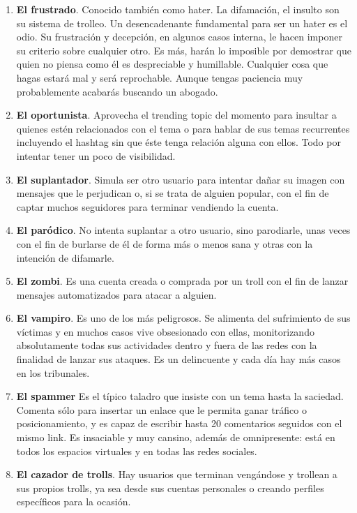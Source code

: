 \documentclass[../all.tex]{subfiles}
\begin{document}
\begin{enumerate}[resume]
        \item \textbf{El frustrado}. Conocido también como hater. La difamación, el insulto son su sistema de trolleo. Un desencadenante fundamental para ser un hater es el odio. Su frustración y decepción, en algunos casos interna, le hacen imponer su criterio sobre cualquier otro. Es más, harán lo imposible por demostrar que quien no piensa como él es despreciable y humillable. Cualquier cosa que hagas estará mal y será reprochable. Aunque tengas paciencia muy probablemente acabarás buscando un abogado.
        \item \textbf{El oportunista}. Aprovecha el trending topic del momento para insultar a quienes estén relacionados con el tema o para hablar de sus temas recurrentes incluyendo el hashtag sin que éste tenga relación alguna con ellos. Todo por intentar tener un poco de visibilidad.
        \item \textbf{El suplantador}. Simula ser otro usuario para intentar dañar su imagen con mensajes que le perjudican o, si se trata de alguien popular, con el fin de captar muchos seguidores para terminar vendiendo la cuenta.
        \item \textbf{El paródico}. No intenta suplantar a otro usuario, sino parodiarle, unas veces con el fin de burlarse de él de forma más o menos sana y otras con la intención de difamarle.
        \item \textbf{El zombi}. Es una cuenta creada o comprada por un troll con el fin de lanzar mensajes automatizados para atacar a alguien.
        \item \textbf{El vampiro}. Es uno de los más peligrosos. Se alimenta del sufrimiento de sus víctimas y en muchos casos vive obsesionado con ellas, monitorizando absolutamente todas sus actividades dentro y fuera de las redes con la finalidad de lanzar sus ataques. Es un delincuente y cada día hay más casos en los tribunales.
        \item \textbf{El spammer} Es el típico taladro que insiste con un tema hasta la saciedad. Comenta sólo para insertar un enlace que le permita ganar tráfico o posicionamiento, y es capaz de escribir hasta 20 comentarios seguidos con el mismo link. Es insaciable y muy cansino, además de omnipresente: está en todos los espacios virtuales y en todas las redes sociales.
        \item \textbf{El cazador de trolls}. Hay usuarios que terminan vengándose y trollean a sus propios trolls, ya sea desde sus cuentas personales o creando perfiles específicos para la ocasión.
    \end{enumerate}
\end{document}

